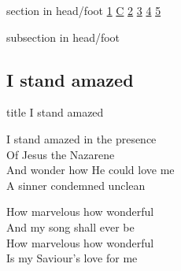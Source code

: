 \documentclass{beamer}
\begin{document}
{
{ 
 {
 \begin{beamercolorbox}[ht=4.5ex,dp=1.5ex,%
      leftskip=.3cm,rightskip=.3cm plus1fil]{section in head/foot}
 \fontsize{12}{25}\selectfont 
\hyperlink{I stand amazed['How marvelous']1}{1}
\hyperlink{I stand amazed['How marvelous']C}{C}
\hyperlink{I stand amazed['How marvelous']2}{2}
\hyperlink{I stand amazed['How marvelous']3}{3}
\hyperlink{I stand amazed['How marvelous']4}{4}
\hyperlink{I stand amazed['How marvelous']5}{5}
 
 \end{beamercolorbox}%
  \begin{beamercolorbox}[ht=2.5ex,dp=1.125ex,%
   leftskip=.3cm,rightskip=.3cm plus1fil]{subsection in head/foot}
   \insertauthor
 \end{beamercolorbox}%
 }
}
\subsection{ I stand amazed }

\hypertarget{I stand amazed['How marvelous']}{}
\begin{frame}{}
 \vfill
  \centering
  \begin{beamercolorbox}[sep=8pt,center,shadow=true,rounded=true]{title}
    I stand amazed    
  \end{beamercolorbox}
  \vfill
\end{frame}

\hypertarget{I stand amazed['How marvelous']1}{}
\begin{frame}{}
\fontsize{ 20 }{ 27 }\selectfont

I stand amazed in the presence\\ 
Of Jesus the Nazarene\\ 
And wonder how He could love me\\ 
A sinner condemned unclean 

\end{frame}

\hypertarget{I stand amazed['How marvelous']C}{}
\begin{frame}{}
\fontsize{ 20 }{ 27 }\selectfont

How marvelous how wonderful\\ 
And my song shall ever be\\ 
How marvelous how wonderful\\ 
Is my Saviour's love for me 


\end{frame}}
\end{document}
